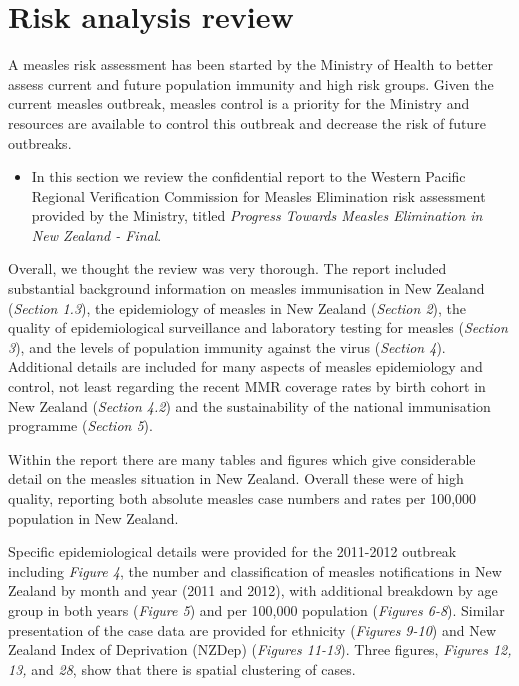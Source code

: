 \documentclass{article}
\begin{document}
\section{Risk analysis review}

A measles risk assessment has been started by the Ministry of Health to better assess current and future population immunity and high risk groups. Given the current measles outbreak, measles control is a priority for the Ministry and resources are available to control this outbreak and decrease the risk of future outbreaks.
\begin{itemize}
\item In this section we review the confidential report to the Western Pacific Regional Verification Commission for Measles Elimination risk assessment provided by the Ministry, titled \emph {Progress Towards Measles Elimination in New Zealand - Final}.
\end{itemize}

Overall, we thought the review was very thorough. The report included substantial background information on measles immunisation in New Zealand (\emph{Section 1.3}), the epidemiology of measles in New Zealand (\emph{Section 2}), the quality of epidemiological surveillance and laboratory testing for measles (\emph{Section 3}), and the levels of population immunity against the virus (\emph{Section 4}). Additional details are included for many aspects of measles epidemiology and control, not least regarding the recent MMR coverage rates by birth cohort in New Zealand (\emph{Section 4.2}) and the sustainability of the national immunisation programme (\emph{Section 5}).

Within the report there are many tables and figures which give considerable detail on the measles situation in New Zealand. Overall these were of high quality, reporting both absolute measles case numbers and rates per 100,000 population in New Zealand.

Specific epidemiological details were provided for the 2011-2012 outbreak including \emph{Figure 4}, the number and classification of measles notifications in New Zealand by month and year (2011 and 2012), with additional breakdown by age group in both years (\emph{Figure 5}) and per 100,000 population (\emph{Figures 6-8}). Similar presentation of the case data are provided for ethnicity (\emph{Figures 9-10}) and New Zealand Index of Deprivation (NZDep) (\emph{Figures 11-13}). Three figures, \emph{Figures 12, 13,} and \emph{28}, show that there is spatial clustering of cases.
\end{document}
